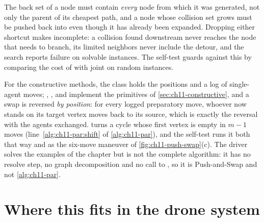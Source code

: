 \begin{pitfall}
The back set of a node must contain \emph{every} node from which it was
generated, not only the parent of its cheapest path, and a node whose
collision set grows must be pushed back into \Open even though it has
already been expanded. Dropping either shortcut makes \mstar incomplete: a
collision found downstream never reaches the node that needs to branch,
its limited neighbors never include the detour, and the search reports
failure on solvable instances. The self-test guards against this by
comparing the cost of \mstar with joint \astar on random instances.
\end{pitfall}

For the constructive methods, the class  holds the
positions and a log of single-agent moves; , ,
 and  implement the primitives of
\cref{sec:ch11-constructive}, and a
swap is reversed \emph{by position}: for every logged preparatory move,
whoever now stands on its target vertex moves back to its source, which is
exactly the reversal with the agents exchanged.  turns a cycle
whose first vertex is empty in $m-1$ moves
(line~\ref{alg:ch11-par:shift} of \cref{alg:ch11-par}), and the self-test runs
it both that way and as the six-move maneuver of
\cref{fig:ch11-push-swap}(c). The driver
 solves the examples of the chapter but is not the
complete algorithm: it has no resolve step, no graph decomposition and no
call to , so it is Push-and-Swap and not
\cref{alg:ch11-par}.
\FloatBarrier

\section{Where this fits in the drone system}
\label{sec:ch11-drone}

